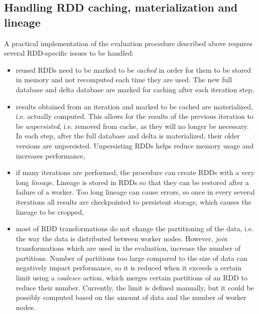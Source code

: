 \subsection{Handling RDD caching, materialization and lineage}
A practical implementation of the evaluation procedure described above requires several RDD-specific issues to be handled:
\begin{itemize}
\item reused RDDs need to be marked to be \emph{cached} in order for them to be stored in memory and not recomputed each time they are used. The new full database and delta database are marked for caching after each iteration step,
\item results obtained from an iteration and marked to be cached are materialized, i.e. actually computed. This allows for the results of the previous iteration to be \emph{unpersisted}, i.e. removed from cache, as they will no longer be necessary. In each step, after the full database and delta is materialized, their older versions are unpersisted. Unpersisting RDDs helps reduce memory usage and increases performance,
\item if many iterations are performed, the procedure can create RDDs with a very long \emph{lineage}. Lineage is stored in RDDs so that they can be restored after a failure of a worker. Too long lineage can cause errors, so once in every several iterations all results are checkpointed to persistent storage, which causes the lineage to be cropped,
\item most of RDD transformations do not change the partitioning of the data, i.e. the way the data is distributed between worker nodes. However, \emph{join} transformations which are used in the evaluation, increase the number of partitions. Number of partitions too large compared to the size of data can negatively impact performance, so it is reduced when it exceeds a certain limit using a \emph{coalesce} action, which merges certain partitions of an RDD to reduce their number. Currently, the limit is defined manually, but it could be possibly computed based on the amount of data and the number of worker nodes. 
\end{itemize}


